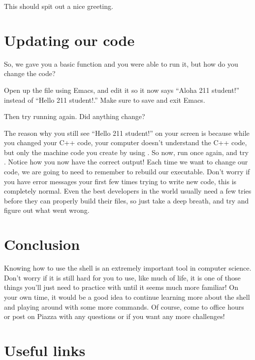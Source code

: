 \documentclass{tufte-handout}
\begin{document}
\noindent
This should spit out a nice greeting.

\section{Updating our code}

So, we gave you a basic function and you were able to run it, but how do
you change the code?

Open up the  file using Emacs, and edit it so it
now says ``Aloha 211 student!'' instead of ``Hello 211 student!.'' Make
sure to save and exit Emacs.

Then try running  again. Did anything change?

The reason why you still see ``Hello 211 student!'' on your screen is
because while you changed your C++ code, your computer doesn't
understand the C++ code, but only the machine code you create by using
.  So now, run  once again, and
try . Notice how you now have the correct output!
Each time we want to change our code, we are going to need to remember
to rebuild our executable. Don't worry if you have error messages your
first few times trying to write new code, this is completely normal.
Even the best developers in the world usually need a few tries before
they can properly build their files, so just take a deep breath, and try
and figure out what went wrong.

\section{Conclusion}

Knowing how to use the shell is an extremely important tool in computer
science. Don't worry if it is still hard for you to use, like much of
life, it is one of those things you'll just need to practice with until
it seems much more familiar!  On your own time, it would be a good idea
to continue learning more about the shell and playing around with some
more commands.
Of course, come to office hours or post on Piazza with any questions or
if you want any more challenges!

\section{Useful links}
\end{document}
